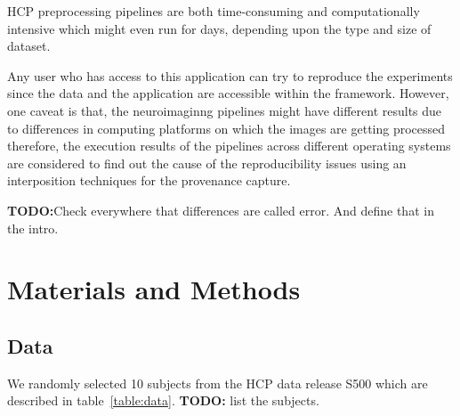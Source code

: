 \documentclass{article}
\newcommand{\todo}[1]{\color{red}\textbf{TODO:}#1\color{black}}
\begin{document}
HCP preprocessing pipelines are both time-consuming and
computationally intensive which might even run for days, depending
upon the type and size of dataset.

Any
user who has access to this application can try to reproduce the
experiments since the data and the application are accessible within
the framework. However, one caveat is that, the neuroimaginng
pipelines might have different results due to differences in computing
platforms on which the images are getting processed
~\cite{10.3389/conf.fninf.2014.18.00076} therefore, the execution
results of the pipelines across different operating systems are
considered to find out the cause of the reproducibility issues using
an interposition techniques for the provenance capture.

\todo{Check everywhere that differences are called error. And define that in the intro.}


\section{Materials and Methods}

\subsection{Data}

We randomly selected 10 subjects from the HCP data release
S500 which are described in table~\ref{table:data}. \todo{ list the subjects.}
\end{document}
